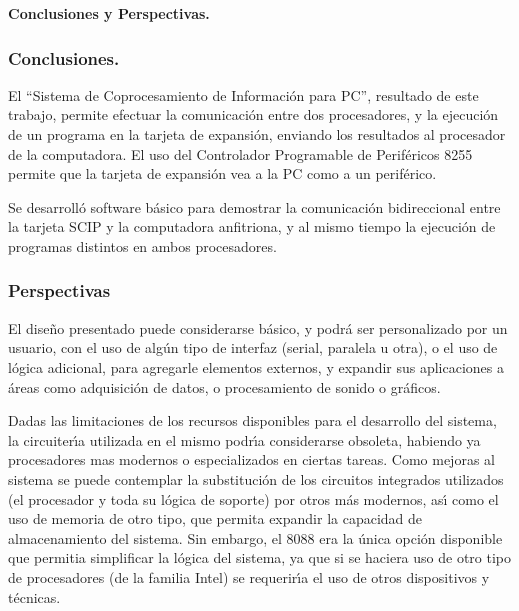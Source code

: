 \vspace*{20pt}
\begin{flushleft}
{\LARGE\bf Conclusiones y Perspectivas.}
\end{flushleft}
\vskip 50pt
\label{Chapter:conclusiones}


\subsubsection{Conclusiones.}
\label{Subsubsection:conclusiones}

El ``Sistema de Coprocesamiento de Informaci\'on para PC'', resultado de este trabajo, permite %
efectuar la comunicaci\'on entre dos procesadores, y la ejecuci\'on de un programa en la tarjeta %
de expansi\'on, enviando los resultados al procesador de la computadora. El uso del Controlador %
Programable de Perif\'ericos 8255 permite que la tarjeta de expansi\'on vea a la PC como a un %
perif\'erico.

Se desarroll\'o software b\'asico para demostrar la comunicaci\'on bidireccional entre la %
tarjeta SCIP y la computadora anfitriona, y al mismo tiempo la ejecuci\'on de programas distintos %
en ambos procesadores.

\subsubsection{Perspectivas}
\label{Subsubsection:perspectivas}

El dise\~no presentado puede considerarse b\'asico, y podr\'a ser personalizado por un usuario, %
con el uso de alg\'un tipo de interfaz (serial, paralela  u otra), o el uso de l\'ogica %
adicional, para agregarle elementos externos, y expandir sus aplicaciones a \'areas como %
adquisici\'on de datos, o procesamiento de sonido o gr\'aficos.

Dadas las limitaciones de los recursos disponibles para el desarrollo del sistema, la %
circuiter\'{\i}a utilizada en el mismo podr\'{\i}a considerarse obsoleta, habiendo ya %
procesadores mas modernos o especializados en ciertas tareas.  
Como mejoras al sistema se puede contemplar la substituci\'on de los circuitos integrados %
utilizados (el procesador y toda su l\'ogica de soporte) por otros m\'as modernos, as\'{\i} %
como el uso de memoria de otro tipo, que permita expandir la capacidad de almacenamiento del %
sistema. Sin embargo, el 8088 era la \'unica opci\'on disponible que permitia simplificar la %
l\'ogica del sistema, ya que si se haciera uso de otro tipo de procesadores (de la familia Intel) %
se requerir\'{\i}a el uso de otros dispositivos y t\'ecnicas.

